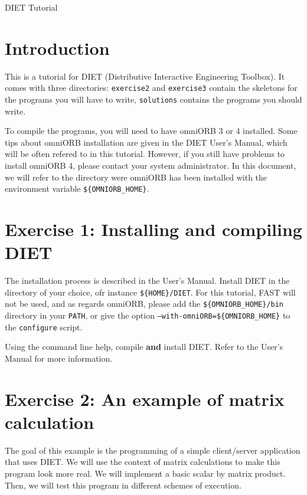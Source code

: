 \documentclass[11pt,a4paper]{article}
\begin{document}
\begin{center}
{\Huge DIET Tutorial \par}
\end{center}



\section{Introduction}

This is a tutorial for DIET (Distributive Interactive Engineering Toolbox). It
comes with three directories: \texttt{exercise2} and \texttt{exercise3} contain
the skeletons for the programs you will have to write, \texttt{solutions}
contains the programs you should write.

To compile the programs, you will need to have omniORB 3 or 4 installed. Some
tips about omniORB installation are given in the DIET User's Manual, which will
be often refered to in this tutorial. However, if you still have problems to
install omniORB 4, please contact your system administrator.
In this document, we will refer to the directory were omniORB has been installed
with the environment variable \texttt{\$\{OMNIORB\_HOME\}}.



\section{Exercise 1: Installing and compiling DIET}

The installation process is described in the User's Manual. Install DIET in the
directory of your choice, ofr instance \texttt{\$\{HOME\}/DIET}. For this
tutorial, FAST will not be used, and as regards omniORB, please add the
\texttt{\$\{OMNIORB\_HOME\}/bin} directory in your \texttt{PATH}, or give the
option \texttt{--with-omniORB=\$\{OMNIORB\_HOME\}} to the \texttt{configure}
script.

Using the command line help, compile {\bf and} install DIET. Refer to the User's
Manual for more information.



\section{Exercise 2: An example of matrix calculation}

The goal of this example is the programming of a simple client/server
application that uses DIET. We will use the context of matrix calculations to 
make this program look more real. We will implement a basic scalar by matrix
product. Then, we will test this program in different schemes of execution.
\par
\end{document}
